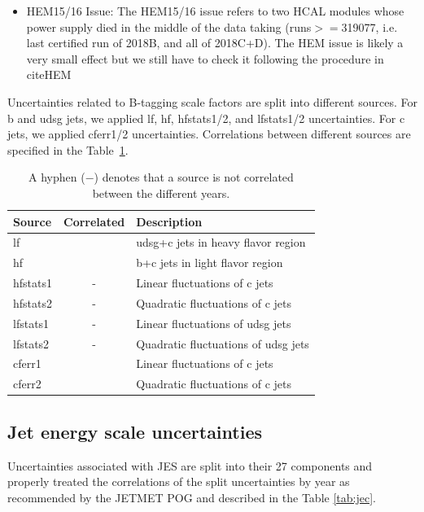 \begin{itemize}
\item HEM15/16 Issue: The HEM15/16 issue refers to two HCAL modules whose power supply died in 
the middle of the data taking (runs$>=$319077, i.e. last certified run of 
2018B, and all of 2018C+D). The HEM issue is likely a very small effect but we still have to check it following the procedure in cite{HEM}
\end{itemize}

Uncertainties related to B-tagging scale factors are split into different sources. For b and udsg jets, we applied lf, hf, hfstats1/2, and lfstats1/2 uncertainties. For c jets, we applied cferr1/2 uncertainties. Correlations between different sources are specified in the Table~\ref{tab:btagsys}.

\begin{table}[!hbtp]
\sffamily
\centering
\caption{
A hyphen ($-$) denotes that a source is not correlated between the different years.
}
\begin{tabular}{lcl}
\toprule
Source & Correlated & Description\\
\midrule
lf			& \checkmark & udsg+c jets in heavy flavor region\\ %
hf			& \checkmark & b+c jets in light flavor region \\ %
hfstats1	& - 		 & Linear fluctuations of c jets\\
hfstats2	& -			 & Quadratic fluctuations of c jets \\
lfstats1	& -			 & Linear fluctuations of udsg jets \\
lfstats2	& -			 & Quadratic fluctuations of udsg jets \\
cferr1		& \checkmark & Linear fluctuations of c jets \\
cferr2		& \checkmark & Quadratic fluctuations of c jets \\
\bottomrule
\end{tabular}
\label{tab:btagsys}
\end{table}

\subsection{Jet energy scale uncertainties}

Uncertainties associated with JES are split into their 27 components and properly treated the correlations of the split uncertainties by year as recommended by the JETMET POG and described in the Table \ref{tab:jec}.

